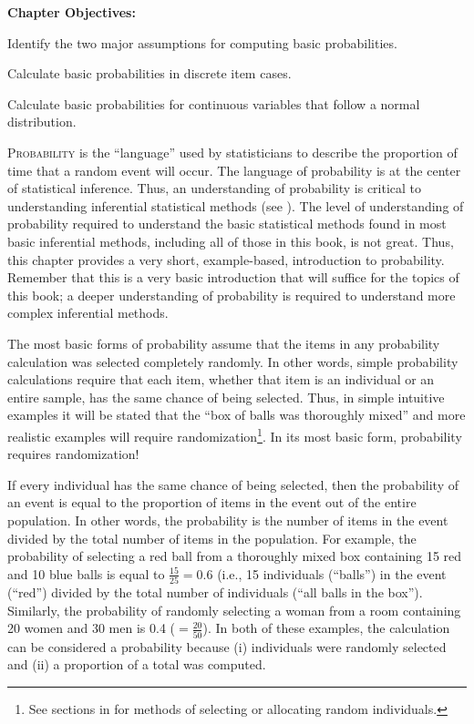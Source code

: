 \documentclass[10pt,openany]{book}\usepackage[]{graphicx}\usepackage[]{color}
\begin{document}
\begin{ChapObj}{\boxwidth}
  \textbf{Chapter Objectives:}
  \begin{Enumerate}
    \item Identify the two major assumptions for computing basic probabilities.
    \item Calculate basic probabilities in discrete item cases.
    \item Calculate basic probabilities for continuous variables that follow a normal distribution.
  \end{Enumerate}
\end{ChapObj}


\lettrine{P}{robability} is the ``language'' used by statisticians to describe the proportion of time that a random event will occur.  The language of probability is at the center of statistical inference.  Thus, an understanding of probability is critical to understanding inferential statistical methods (see ).  The level of understanding of probability required to understand the basic statistical methods found in most basic inferential methods, including all of those in this book, is not great.  Thus, this chapter provides a very short, example-based, introduction to probability.  Remember that this is a very basic introduction that will suffice for the topics of this book; a deeper understanding of probability is required to understand more complex inferential methods.

The most basic forms of probability assume that the items in any probability calculation was selected completely randomly.  In other words, simple probability calculations require that each item, whether that item is an individual or an entire sample, has the same chance of being selected.  Thus, in simple intuitive examples it will be stated that the ``box of balls was thoroughly mixed'' and more realistic examples will require randomization\footnote{See sections in  for methods of selecting or allocating random individuals.}.  In its most basic form, probability requires randomization!


If every individual has the same chance of being selected, then the probability of an event is equal to the proportion of items in the event out of the entire population.  In other words, the probability is the number of items in the event divided by the total number of items in the population.  For example, the probability of selecting a red ball from a thoroughly mixed box containing 15 red and 10 blue balls is equal to $\frac{15}{25}=0.6$ (i.e., 15 individuals (``balls'') in the event (``red'') divided by the total number of individuals (``all balls in the box'').  Similarly, the probability of randomly selecting a woman from a room containing 20 women and 30 men is 0.4 ($=\frac{20}{50}$).  In both of these examples, the calculation can be considered a probability because (i) individuals were randomly selected and (ii) a proportion of a total was computed.
\end{document}
